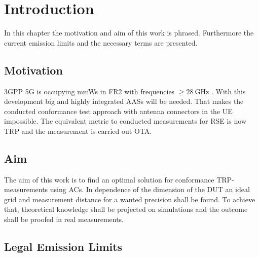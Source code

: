 \chapter{Introduction}

In this chapter the motivation and aim of this work is phrased. Furthermore the current emission limits and the necessary terms are presented.

\section{Motivation}

\ac{3GPP} \ac{5G} is occupying \acp{mmW} in \ac{FR2} with frequencies $\ge\SI{28}{\giga\hertz}$ \cite{trp}. With this development big and highly integrated  \acp{AAS} will be needed. That makes the conducted conformance test approach with antenna connectors in the \ac{UE} impossible. The equivalent metric to conducted measurements for \ac{RSE} is now \ac{TRP} and the measurement is carried out \ac{OTA}.


\section{Aim}

The aim of this work is to find an optimal solution for conformance  \ac{TRP}-measurements using \acp{AC}. In dependence of the dimension of the \ac{DUT} an ideal grid and measurement distance for a wanted precision shall be found. To achieve that, theoretical knowledge shall be projected on simulations and the outcome shall be proofed in real measurements.

\section{Legal Emission Limits}
\label{sec:legem}

